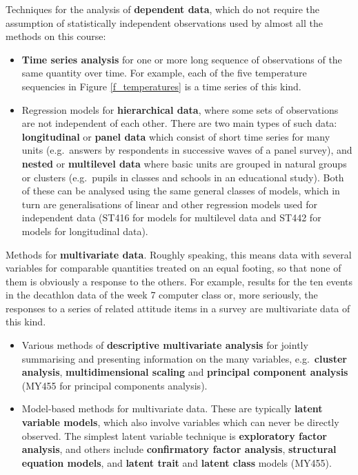 Techniques for the analysis of \textbf{dependent data}, which do not
require the assumption of statistically independent observations used by
almost all the methods on this course:
\begin{itemize}
\item
\textbf{Time series analysis} for one or more long sequence of
observations of the same quantity over time. For example, each of the
five temperature sequencies in Figure \ref{f_temperatures} is a time
series of this kind.
\item
Regression models for \textbf{hierarchical data}, where some sets of
observations are not independent of each other. There are two main types
of such data: \textbf{longitudinal} or \textbf{panel data} which consist
of short time series for many units (e.g.\ answers
by respondents in successive waves of a panel survey), and \textbf{nested} or
\textbf{multilevel data} where basic units are grouped in natural
groups or clusters (e.g.\ pupils in classes and schools in an
educational study). Both of these can be analysed using the same general
classes of models, which in turn are generalisations of linear and other
regression models used for independent data
(ST416 for models for multilevel data and ST442 for models for
longitudinal data).
\end{itemize}

Methods for \textbf{multivariate data}. Roughly speaking,
this means data with several variables for comparable
quantities treated on an equal footing, so that
none of them is obviously a response to the others. For example, results
for the ten events in the decathlon data of the week 7 computer class or, more seriously,
the responses to a series of related attitude items in a survey are
multivariate data of this kind.
\begin{itemize}
\item
Various methods of \textbf{descriptive multivariate analysis} for
jointly summarising and presenting information on the many variables,
e.g.\
\textbf{cluster analysis}, \textbf{multidimensional scaling} and
\textbf{principal component analysis} (MY455 for principal components
analysis).
\item
Model-based methods for multivariate data. These are typically
\textbf{latent variable models}, which also
involve variables which can never be directly observed. The simplest
latent variable technique is
\textbf{exploratory factor analysis},
and others include \textbf{confirmatory factor analysis},
\textbf{structural equation models}, and \textbf{latent trait} and
\textbf{latent class} models (MY455).
\end{itemize}

